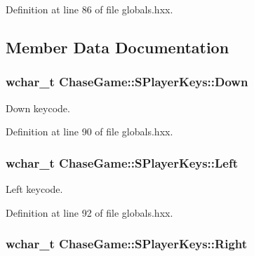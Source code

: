 Definition at line 86 of file globals.\-hxx.



\subsection{Member Data Documentation}
\hypertarget{struct_chase_game_1_1_s_player_keys_abe56af951c133c98b24401542f28ec9b}{
\subsubsection[{Down}]{\setlength{\rightskip}{0pt plus 5cm}wchar\-\_\-t Chase\-Game\-::\-S\-Player\-Keys\-::\-Down}}\label{struct_chase_game_1_1_s_player_keys_abe56af951c133c98b24401542f28ec9b}


Down keycode. 



Definition at line 90 of file globals.\-hxx.

\hypertarget{struct_chase_game_1_1_s_player_keys_ab6c4f7e03fa43cd9443dcbd16a5e3250}{
\subsubsection[{Left}]{\setlength{\rightskip}{0pt plus 5cm}wchar\-\_\-t Chase\-Game\-::\-S\-Player\-Keys\-::\-Left}}\label{struct_chase_game_1_1_s_player_keys_ab6c4f7e03fa43cd9443dcbd16a5e3250}


Left keycode. 



Definition at line 92 of file globals.\-hxx.

\hypertarget{struct_chase_game_1_1_s_player_keys_a17ec0fea68ec78ad4577c6b56b83fa15}{
\subsubsection[{Right}]{\setlength{\rightskip}{0pt plus 5cm}wchar\-\_\-t Chase\-Game\-::\-S\-Player\-Keys\-::\-Right}}\label{struct_chase_game_1_1_s_player_keys_a17ec0fea68ec78ad4577c6b56b83fa15}


